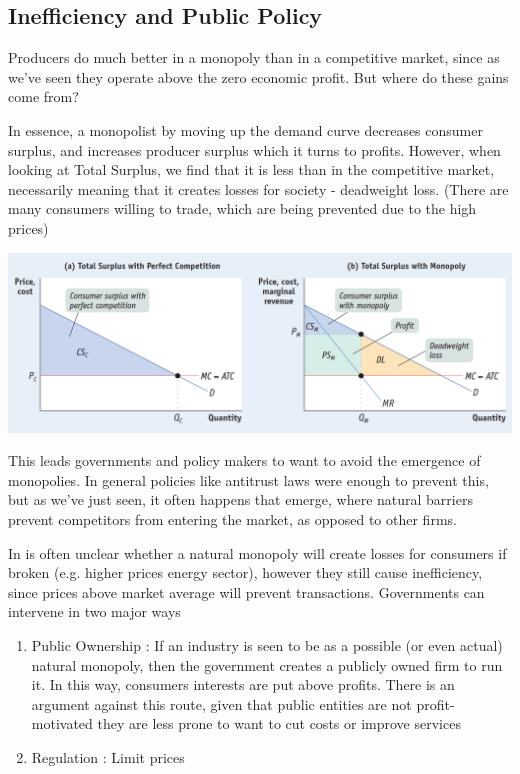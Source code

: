 \documentclass[english,course,draft]{Notes}
\begin{document}
\subsection{Inefficiency and Public Policy}

\par{Producers do much better in a monopoly than in a competitive market, since as we've seen they operate above the zero economic profit. But where do these gains come from?}
\par{In essence, a monopolist by moving up the demand curve decreases consumer surplus, and increases producer surplus which it turns to profits. However, when looking at Total Surplus, we find that it is less than in the competitive market, necessarily meaning that it creates losses for society - deadweight loss. (There are many consumers willing to trade, which are being prevented due to the high prices)}

\includegraphics[width=\textwidth]{mon4}

\par{This leads governments and policy makers to want to avoid the emergence of monopolies. In general policies like antitrust laws were enough to prevent this, but as we've just seen, it often happens that  emerge, where natural barriers prevent competitors from entering the market, as opposed to other firms.}
\par{In is often unclear whether a natural monopoly will create losses for consumers if broken (e.g. higher prices energy sector), however they still cause inefficiency, since prices above market average will prevent transactions. Governments can intervene in two major ways}

\begin{enumerate}
	\item Public Ownership : If an industry is seen to be as a possible (or even actual) natural monopoly, then the government creates a publicly owned firm to run it. In this way, consumers interests are put above profits. There is an argument against this route, given that public entities are not profit-motivated they are less prone to want to cut costs or improve services 
	\item Regulation : Limit prices
\end{enumerate}
\end{document}
